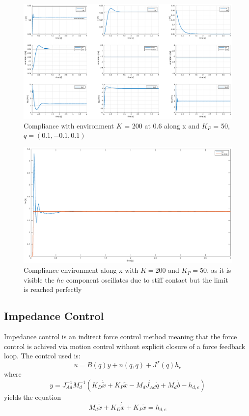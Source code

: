 \documentclass[a4paper,12pt]{article}
\begin{document}
\begin{figure}[H]
    \begin{center}
        \hspace*{-4.5cm}
        \includegraphics[scale=0.5]{images/compliance_stiff.eps}
    \end{center}
    \caption{Compliance with environment $K$ = 200 at 0.6 along x and $K_P$ = 50, $q = (0.1,-0.1,0.1)$}
    \label{fig:compliance_stiff}
\end{figure}

\begin{figure}[H]
    \begin{center}
        \hspace*{-0cm}
        \includegraphics[scale=0.25]{images/compliance_env.eps}
    \end{center}
    \caption{Compliance environment along x with $K = 200$ and $K_P = 50$, as it is visible the $he$ component oscillates due to stiff contact but the limit is reached perfectly}
    \label{fig:comliance_env}
\end{figure}

\subsection{Impedance Control}
Impedance control is an indirect force control method meaning that the force control is achived via motion control without explicit closure of a force feedback loop. The control used is:
\[
    u = B(q)y + n(q,\dot{q}) + J^T(q)h_e
\]
where
\[
    y = J_{Ad}^{-1}M_d^{-1}\left( K_D\dot{\tilde{x}} + K_P \tilde{x} - M_d\dot{J_{Ad}}\dot{q} + M_d\dot{b} - h_{d,e} \right)
\]
yields the equation
\[
    M_d\ddot{\tilde{x}} + K_D\dot{\tilde{x}} + K_P\tilde{x} = h_{d,e}
\]
\end{document}
